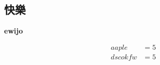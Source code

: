 
\subsection{快樂}

\textbf{ewijo}

\begin{equation*}
\begin{aligned*}
aaple &= 5\\
dscokfw &= 5
\end{aligned*}
\end{equation*}